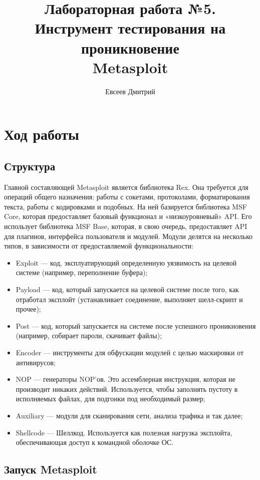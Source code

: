 \documentclass[10pt,a4paper]{report}
\author{Евсеев Дмитрий}
\title{Лабораторная работа №5.\\
	Инструмент тестирования на проникновение\\
	Metasploit}
\begin{document}
\maketitle
\tableofcontents
\pagebreak

\section{Ход работы}

\subsection{Структура}

Главной составляющей Metasploit является библиотека Rex. Она требуется для операций общего назначения: работы с сокетами, протоколами, форматирования текста, работы с кодировками и подобных. На ней базируется библиотека MSF Core, которая предоставляет базовый функционал и «низкоуровневый» API. Его использует библиотека MSF Base, которая, в свою очередь, предоставляет API для плагинов, интерфейса пользователя и модулей. Модули делятся на несколько типов, в зависимости от предоставляемой функциональности:

\begin{itemize}
	\item Exploit — код, эксплуатирующий определенную уязвимость на целевой системе (например, переполнение буфера);
	\item Payload — код, который запускается на целевой системе после того, как отработал эксплойт (устанавливает соединение, выполняет шелл-скрипт и прочее);
	\item Post — код, который запускается на системе после успешного проникновения (например, собирает пароли, скачивает файлы);
	\item Encoder — инструменты для обфускации модулей с целью маскировки от антивирусов;
	\item NOP — генераторы NOP’ов. Это ассемблерная инструкция, которая не производит никаких действий. Используется, чтобы заполнять пустоту в исполняемых файлах, для подгонки под необходимый размер;
	\item Auxiliary — модули для сканирования сети, анализа трафика и так далее;
	\item Shellcode — Шеллкод. Используется как полезная нагрузка эксплойта, обеспечивающая доступ к командной оболочке ОС.
\end{itemize}
	
\subsection{Запуск Metasploit}
\end{document}
